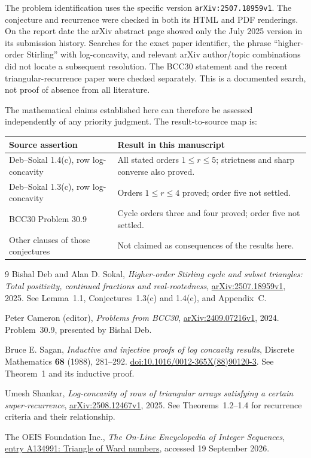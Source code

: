 \documentclass[11pt,a4paper]{article}
\numberwithin{equation}{section}
\theoremstyle{definition}
\theoremstyle{remark}
\begin{document}
The problem identification uses the specific version
\texttt{arXiv:2507.18959v1}. The conjecture and recurrence were checked in
both its HTML and PDF renderings. On the report date the arXiv abstract
page showed only the July 2025 version in its submission history.
Searches for the exact paper identifier, the phrase ``higher-order Stirling''
with log-concavity, and relevant arXiv author/topic combinations did not
locate a subsequent resolution. The BCC30 statement and the recent
triangular-recurrence paper \cite{Shankar} were checked separately.
This is a documented search, not proof of absence from all literature.

The mathematical claims established here can therefore be assessed
independently of any priority judgment. The result-to-source map is:
\begin{center}
\small
\renewcommand{\arraystretch}{1.25}
\begin{tabular}{>{\raggedright\arraybackslash}p{}>{\raggedright\arraybackslash}p{}}
\toprule
Source assertion & Result in this manuscript\\
\midrule
Deb--Sokal 1.4(c), row log-concavity & All stated orders $1\le r\le5$;
strictness and sharp converse also proved.\\
Deb--Sokal 1.3(c), row log-concavity & Orders $1\le r\le4$ proved;
order five not settled.\\
BCC30 Problem 30.9 & Cycle orders three and four proved;
order five not settled.\\
Other clauses of those conjectures & Not claimed as consequences of the results here.\\
\bottomrule
\end{tabular}
\end{center}

\begin{thebibliography}{9}
Bishal Deb and Alan D. Sokal,
\emph{Higher-order Stirling cycle and subset triangles: Total positivity,
continued fractions and real-rootedness},
\href{https://arxiv.org/abs/2507.18959}{arXiv:2507.18959v1}, 2025.
See Lemma~1.1, Conjectures~1.3(c) and 1.4(c), and Appendix~C.

Peter Cameron (editor), \emph{Problems from BCC30},
\href{https://arxiv.org/abs/2409.07216}{arXiv:2409.07216v1}, 2024.
Problem~30.9, presented by Bishal Deb.

Bruce E. Sagan, \emph{Inductive and injective proofs of log concavity results},
Discrete Mathematics \textbf{68} (1988), 281--292.
\href{https://doi.org/10.1016/0012-365X(88)90120-3}{doi:10.1016/0012-365X(88)90120-3}.
See Theorem~1 and its inductive proof.

Umesh Shankar, \emph{Log-concavity of rows of triangular arrays satisfying
a certain super-recurrence},
\href{https://arxiv.org/abs/2508.12467}{arXiv:2508.12467v1}, 2025.
See Theorems~1.2--1.4 for recurrence criteria and their relationship.

The OEIS Foundation Inc., \emph{The On-Line Encyclopedia of Integer Sequences},
\href{https://oeis.org/A134991}{entry A134991: Triangle of Ward numbers},
accessed 19 September 2026.
\end{thebibliography}
\end{document}
